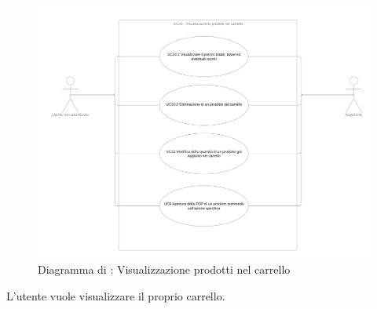 
\begin{figure}[H]
    \centering
    \includegraphics[width=\textwidth]{Immagini/DiagrammiUC/UC10VisualizzazioneProdottiNelCarrello.png}
    \caption{Diagramma di \actualUC: Visualizzazione prodotti nel carrello} 
    \label{fig:VisualizzazioneProdottiNelCarrello}
\end{figure}
L'utente vuole visualizzare il proprio carrello.
